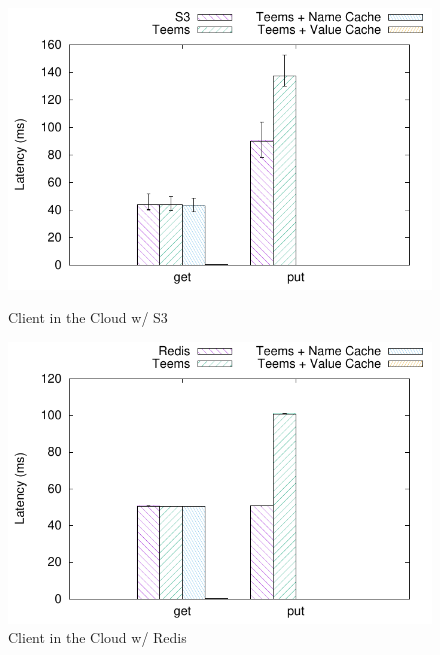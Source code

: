 \begin{figure}[t]
    \centering
    \begin{minipage}[t]{0.45\linewidth}
        \centering
        \includegraphics[width=\linewidth]{teem_results/deployment/result/client_cloud_s3}
        \caption{Client in the Cloud w/ S3}\label{fig:cloud_client_s3}
    \end{minipage}
    \begin{minipage}[t]{0.45\linewidth}
        \centering
        \includegraphics[width=\linewidth]{teem_results/deployment/result/client_cloud_redis}
        \caption{Client in the Cloud w/ Redis}\label{fig:cloud_client_remote_redis}
    \end{minipage}
    \begin{minipage}[t]{0.50\linewidth}
        \centering

\end{minipage}
\end{figure}
